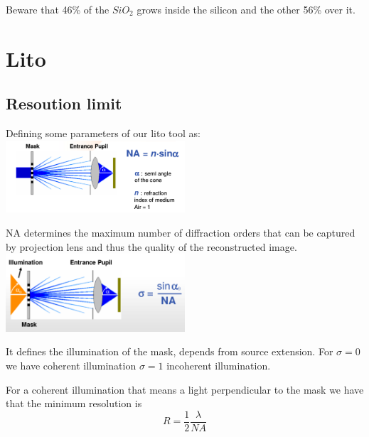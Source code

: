 Beware that 46\% of the $SiO_2$ grows inside the silicon and the other 56\% over it.\\


\section{Lito}

\subsection{Resoution limit}
Defining some parameters of our lito tool as:\\

\centering
\includegraphics[width=0.5\textwidth]{NA.png}\\
\raggedright

NA determines the maximum number of diffraction orders that can be captured by projection lens and thus the quality of the reconstructed image.\\

\centering
\includegraphics[width=0.5\textwidth]{sigma.png}\\
\raggedright

It defines the illumination of the mask, depends from source extension. For $\sigma=0$ we have coherent illumination $\sigma=1$ incoherent illumination.\\

\vspace{3mm}

For a coherent illumination that means a light perpendicular to the mask we have that the minimum resolution is 
\begin{equation}
R=\frac{1}{2}\frac{\lambda}{NA}
\end{equation}
\\
\vspace{3mm}

